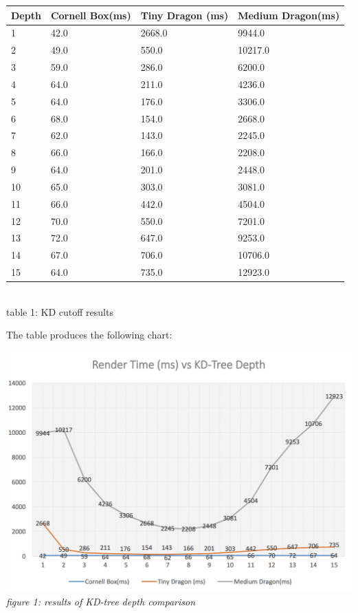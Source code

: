 \documentclass[letterpaper, 10 pt, conference]{ieeeconf}  %
\begin{document}
\begin{table}[H]

\begin{tabular}{@{}llll@{}}
\toprule
Depth & Cornell Box(ms) & Tiny Dragon (ms) & Medium Dragon(ms) \\ \midrule
1     & 42.0            & 2668.0           & 9944.0            \\
2     & 49.0            & 550.0            & 10217.0           \\
3     & 59.0            & 286.0            & 6200.0            \\
4     & 64.0            & 211.0            & 4236.0            \\
5     & 64.0            & 176.0            & 3306.0            \\
6     & 68.0            & 154.0            & 2668.0            \\
7     & 62.0            & 143.0            & 2245.0            \\
8     & 66.0            & 166.0            & 2208.0            \\
9     & 64.0            & 201.0            & 2448.0            \\
10    & 65.0            & 303.0            & 3081.0            \\
11    & 66.0            & 442.0            & 4504.0            \\
12    & 70.0            & 550.0            & 7201.0            \\
13    & 72.0            & 647.0            & 9253.0            \\
14    & 67.0            & 706.0            & 10706.0           \\
15    & 64.0            & 735.0            & 12923.0           \\ \bottomrule
\end{tabular}\\

table 1: KD cutoff results
\end{table}

The table produces the following chart:

\includegraphics[width=.95\columnwidth]{chart_1.png} 
{\small\textit{figure 1: results of KD-tree depth comparison}}
\end{document}
